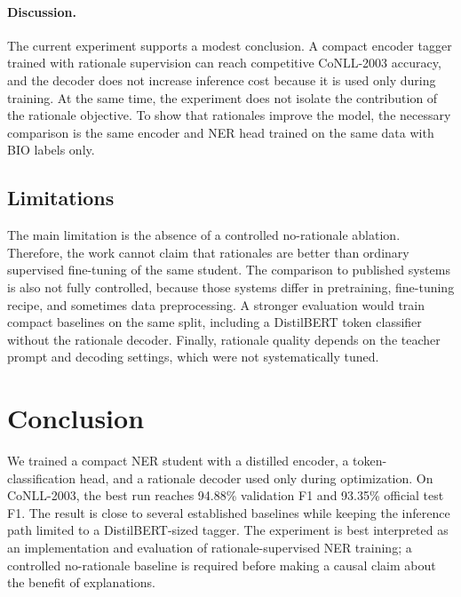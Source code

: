 \documentclass[a4paper,12pt]{extarticle}
\begin{document}
\paragraph{Discussion.}
The current experiment supports a modest conclusion. A compact encoder tagger trained with rationale supervision can reach competitive CoNLL-2003 accuracy, and the decoder does not increase inference cost because it is used only during training. At the same time, the experiment does not isolate the contribution of the rationale objective. To show that rationales improve the model, the necessary comparison is the same encoder and NER head trained on the same data with BIO labels only.

\subsection{Limitations}
\label{sec:limitations}
The main limitation is the absence of a controlled no-rationale ablation. Therefore, the work cannot claim that rationales are better than ordinary supervised fine-tuning of the same student. The comparison to published systems is also not fully controlled, because those systems differ in pretraining, fine-tuning recipe, and sometimes data preprocessing. A stronger evaluation would train compact baselines on the same split, including a DistilBERT token classifier without the rationale decoder. Finally, rationale quality depends on the teacher prompt and decoding settings, which were not systematically tuned.

\FloatBarrier
\section{Conclusion}
\label{sec:conclusion}

We trained a compact NER student with a distilled encoder, a token-classification head, and a rationale decoder used only during optimization. On CoNLL-2003, the best run reaches 94.88\% validation F1 and 93.35\% official test F1. The result is close to several established baselines while keeping the inference path limited to a DistilBERT-sized tagger. The experiment is best interpreted as an implementation and evaluation of rationale-supervised NER training; a controlled no-rationale baseline is required before making a causal claim about the benefit of explanations.

\newpage
\printbibliography[heading=bibintoc,title={References}]
\end{document}
